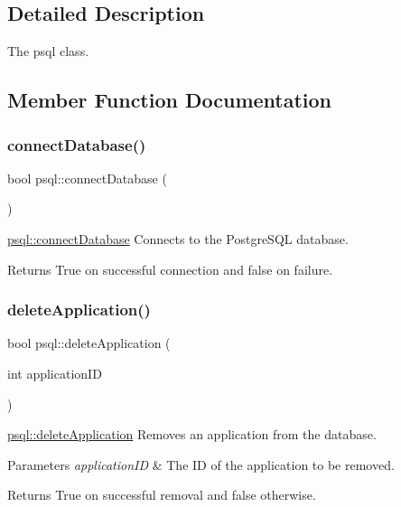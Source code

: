 \subsection{Detailed Description}
The psql class. 

\subsection{Member Function Documentation}
\mbox{\label{classpsql_ada485c933df77453629e3821ab19fa4c}} 
\subsubsection{\texorpdfstring{connect\+Database()}{connectDatabase()}}
{\footnotesize\ttfamily bool psql\+::connect\+Database (\begin{DoxyParamCaption}{ }\end{DoxyParamCaption})}



\hyperlink{classpsql_ada485c933df77453629e3821ab19fa4c}{psql\+::connect\+Database} Connects to the Postgre\+S\+QL database. 

\begin{DoxyReturn}{Returns}
True on successful connection and false on failure. 
\end{DoxyReturn}
\mbox{\label{classpsql_a999ee8e2d813892411ef502ebc055a79}} 
\subsubsection{\texorpdfstring{delete\+Application()}{deleteApplication()}}
{\footnotesize\ttfamily bool psql\+::delete\+Application (\begin{DoxyParamCaption}\item[{int}]{application\+ID }\end{DoxyParamCaption})}



\hyperlink{classpsql_a999ee8e2d813892411ef502ebc055a79}{psql\+::delete\+Application} Removes an application from the database. 


\begin{DoxyParams}{Parameters}
{\em application\+ID} & The ID of the application to be removed. \\
\hline
\end{DoxyParams}
\begin{DoxyReturn}{Returns}
True on successful removal and false otherwise. 
\end{DoxyReturn}
\mbox{\label{classpsql_aaffd42b26b635d9881daaf5fbf4fd62f}} 
